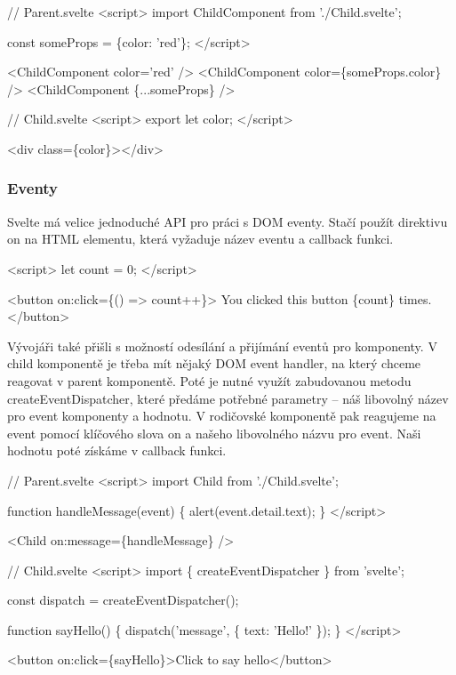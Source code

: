 \begin{prog}
// Parent.svelte
<script>
  import ChildComponent from './Child.svelte';

  const someProps = \{color: 'red'\};
</script>

<ChildComponent color='red' />
<ChildComponent color=\{someProps.color\} />
<ChildComponent \{...someProps\} />

// Child.svelte
<script>
  export let color;
</script>

<div class=\{color\}></div>
\end{prog}

\subsubsection{Eventy}

Svelte má velice jednoduché API pro práci s DOM eventy. Stačí použít direktivu on na HTML elementu, která vyžaduje název eventu a callback funkci.

\begin{prog}
<script>
  let count = 0;
</script>

<button on:click=\{() => count++\}>
  You clicked this button \{count\} times.
</button>
\end{prog}

Vývojáři také přišli s možností odesílání a přijímání eventů pro komponenty. 
V child komponentě je třeba mít nějaký DOM event handler, na který chceme reagovat v parent komponentě. 
Poté je nutné využít zabudovanou metodu createEventDispatcher, které předáme potřebné parametry -- náš libovolný název pro event komponenty a hodnotu. 
V rodičovské komponentě pak reagujeme na event pomocí klíčového slova on a našeho libovolného názvu pro event. Naši hodnotu poté získáme v callback funkci.\cite{sveltehandbook,svelte}

\begin{prog}
// Parent.svelte
<script>
  import Child from './Child.svelte';

  function handleMessage(event) \{
    alert(event.detail.text);
  \}
</script>

<Child on:message=\{handleMessage\} />

// Child.svelte
<script>
  import \{ createEventDispatcher \} from 'svelte';

  const dispatch = createEventDispatcher();

  function sayHello() \{
    dispatch('message', \{
      text: 'Hello!'
    \});
  \}
</script>

<button on:click=\{sayHello\}>Click to say hello</button>
\end{prog}

